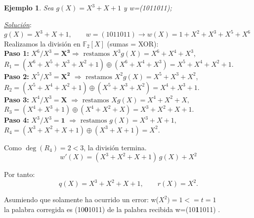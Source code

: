 \documentclass{beamer}
\theoremstyle{plain}
\theoremstyle{example}
\theoremstyle{example}
\newtheorem{ejemplo} [Ejemplo] {Ejemplo}
\begin{document}
\begin{frame}  \footnotesize  
\begin{ejemplo}

Sea $g(X) = X^3 + X+1$ y w=(1011011);


\end{ejemplo}
 \textit{\underline{Solución}}:\\ 
 \vspace{0.2cm}
$ g(X) = X^3 + X + 1, \qquad 
w=(1011011) \rightarrow w(X)= 1+X^2+X^3+X^5+X^6$
\vspace{0.2cm}\\
Realizamos la división en $\mathbb{F}_2[X]$ (sumas = XOR):
\vspace{0.2cm}\\

\textbf{Paso 1:} $X^6 / X^3 = \mathbf{X^3}  \Rightarrow \text{ restamos } X^3 g(X) = X^6 + X^4 + X^3$, \\
$R_1 = (X^6 + X^5 + X^3 + X^2 + 1) \oplus (X^6 + X^4 + X^3) = X^5 + X^4 + X^2 + 1.$ \\[3pt]

\textbf{Paso 2:}  $X^5 / X^3 = \mathbf{X^2}$ 
$\Rightarrow \text{ restamos } X^2 g(X) = X^5 + X^3 + X^2$, \\[4pt]
$R_2 = (X^5 + X^4 + X^2 + 1) \oplus (X^5 + X^3 + X^2) = X^4 + X^3 + 1. $\\[3pt]

\textbf{Paso 3:}  $X^4 / X^3 = \mathbf{X} $
$\Rightarrow \text{ restamos } X g(X) = X^4 + X^2 + X,$ \\[4pt]
$R_3 = (X^4 + X^3 + 1) \oplus (X^4 + X^2 + X) = X^3 + X^2 + X + 1. $\\[3pt]

\textbf{Paso 4:} $X^3 / X^3 = \mathbf{1} $
$\Rightarrow \text{ restamos } g(X) = X^3 + X + 1,$ \\[4pt]
$R_4 = (X^3 + X^2 + X + 1) \oplus (X^3 + X + 1) = \boxed{X^2}.$\\

\vspace{0.2cm}

Como $\deg(R_4) = 2 < 3$, la división termina.
\[
\boxed{w'(X) = (X^3 + X^2 + X + 1)\,g(X) + X^2}
\]

\end{frame}

\begin{frame}  \footnotesize
Por tanto:
\[
q(X) = X^3 + X^2 + X + 1, 
\qquad
r(X) = X^2.
\]

\vspace{0.5cm}

Asumiendo que solamente ha ocurrido un error:
\vspace{0.2cm}
w($X^2)= 1 <= t = 1$\\
\vspace{0.2cm}
la palabra corregida es (10\textbf{0}1011) de la  palabra recibida w=(10\textbf{1}1011) .

\end{frame} 
\end{document}
